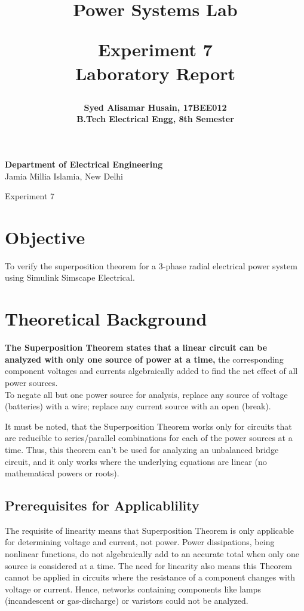 \documentclass[a4paper,12pt]{article}
\title{
  {\Huge \bf Power Systems Lab}\\
  \vspace{0.25in}

  {\bf Experiment 7}\\
  Laboratory Report
  \vspace{1in}
}
\author{
  \bf Syed Alisamar Husain, 17BEE012\\
  B.Tech Electrical Engg, 8th Semester
}
\begin{document}
  \begin{titlepage}
    \maketitle
    \vspace*{\fill}
    \begin{center}
      {\bfseries Department of Electrical Engineering} \\
      Jamia Millia Islamia, New Delhi
    \end{center}
    \thispagestyle{empty}
  \end{titlepage}
  
  \newpage
  \begin{center}
    \huge Experiment 7
    \vspace{0.5in}
  \end{center}

  \section{Objective}
  To verify the superposition theorem for a 3-phase radial 
  electrical power system using Simulink Simscape Electrical.

  \section{Theoretical Background}
  {\bf The Superposition Theorem states that a linear circuit can be analyzed with 
  only one source of power at a time,} the corresponding component voltages and currents 
  algebraically added to find the net effect of all power sources.\\
  
  To negate all but one power source for analysis, replace any source of voltage 
  (batteries) with a wire; replace any current source with an open (break).

  It must be noted, that the Superposition Theorem works only for circuits 
  that are reducible to series/parallel combinations for each of the power sources 
  at a time. Thus, this theorem can't be used for analyzing an unbalanced bridge 
  circuit, and it only works where the underlying equations are linear (no 
  mathematical powers or roots). 

    \subsection{Prerequisites for Applicablility}
    The requisite of linearity means that Superposition Theorem is only applicable 
    for determining voltage and current, not power. Power dissipations, being 
    nonlinear functions, do not algebraically add to an accurate total when only 
    one source is considered at a time. The need for linearity also means this 
    Theorem cannot be applied in circuits where the resistance of a component 
    changes with voltage or current. Hence, networks containing components like 
    lamps (incandescent or gas-discharge) or varistors could not be analyzed.
\end{document}
